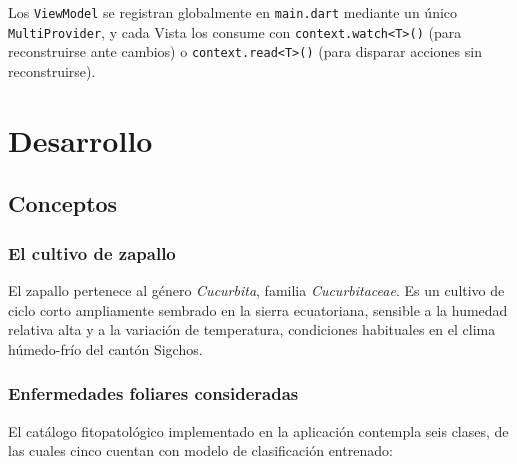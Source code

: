 \documentclass[12pt,a4paper]{article}
\begin{document}
Los \texttt{ViewModel} se registran globalmente en \texttt{main.dart} mediante
un único \texttt{MultiProvider}, y cada Vista los consume con
\texttt{context.watch<T>()} (para reconstruirse ante cambios) o
\texttt{context.read<T>()} (para disparar acciones sin reconstruirse).

\section{Desarrollo}

\subsection{Conceptos}

\subsubsection{El cultivo de zapallo}

El zapallo pertenece al género \textit{Cucurbita}, familia
\textit{Cucurbitaceae}. Es un cultivo de ciclo corto ampliamente sembrado en la
sierra ecuatoriana, sensible a la humedad relativa alta y a la variación de
temperatura, condiciones habituales en el clima húmedo-frío del cantón Sigchos.

\subsubsection{Enfermedades foliares consideradas}

El catálogo fitopatológico implementado en la aplicación contempla seis clases,
de las cuales cinco cuentan con modelo de clasificación entrenado:
\end{document}
